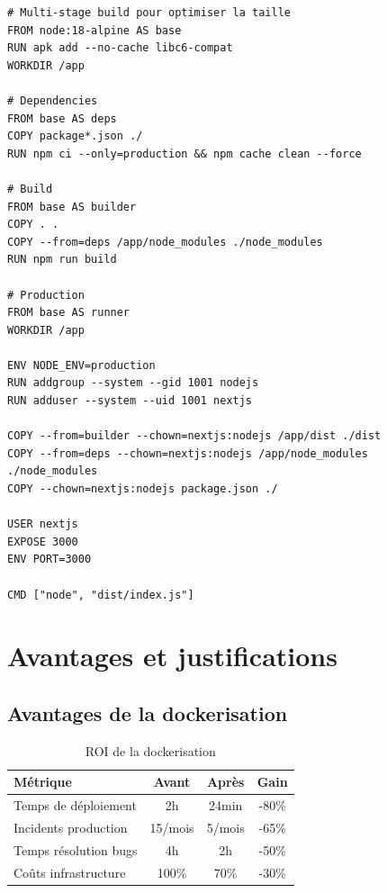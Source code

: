 \documentclass[12pt,a4paper]{report}
\begin{document}
\begin{lstlisting}[caption=Dockerfile multi-stage pour optimiser la taille, language=docker]
# Multi-stage build pour optimiser la taille
FROM node:18-alpine AS base
RUN apk add --no-cache libc6-compat
WORKDIR /app

# Dependencies
FROM base AS deps
COPY package*.json ./
RUN npm ci --only=production && npm cache clean --force

# Build
FROM base AS builder
COPY . .
COPY --from=deps /app/node_modules ./node_modules
RUN npm run build

# Production
FROM base AS runner
WORKDIR /app

ENV NODE_ENV=production
RUN addgroup --system --gid 1001 nodejs
RUN adduser --system --uid 1001 nextjs

COPY --from=builder --chown=nextjs:nodejs /app/dist ./dist
COPY --from=deps --chown=nextjs:nodejs /app/node_modules ./node_modules
COPY --chown=nextjs:nodejs package.json ./

USER nextjs
EXPOSE 3000
ENV PORT=3000

CMD ["node", "dist/index.js"]
\end{lstlisting}

\section{Avantages et justifications}

\subsection{Avantages de la dockerisation}

\begin{table}[H]
    \centering
    \caption{ROI de la dockerisation}
    \begin{tabular}{|l|c|c|c|}
        \hline
        \textbf{Métrique} & \textbf{Avant} & \textbf{Après} & \textbf{Gain} \\
        \hline
        Temps de déploiement & 2h & 24min & -80\% \\
        \hline
        Incidents production & 15/mois & 5/mois & -65\% \\
        \hline
        Temps résolution bugs & 4h & 2h & -50\% \\
        \hline
        Coûts infrastructure & 100\% & 70\% & -30\% \\
        \hline
    \end{tabular}
\end{table}
\end{document}
